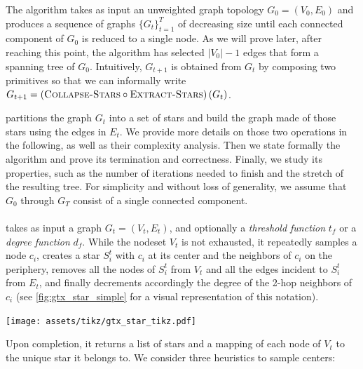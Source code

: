 The \gtx{} algorithm takes as input an unweighted graph topology $G_0=(V_0, E_0)$ and produces a sequence of
graphs $\{G_t\}_{t=1}^T$ of decreasing size until each connected component of $G_0$ is reduced to a
single node. As we will prove later, after reaching this point, the algorithm has selected $|V_0| -
1$ edges that form a spanning tree of $G_0$. Intuitively, $G_{t+1}$ is obtained from $G_t$ by composing two
primitives so that we can informally write $G_{t+1} = \left(\textsc{Collapse-Stars}{} \circ
\textsc{Extract-Stars}{}\right)(G_t)$.

\extractStar{} partitions the graph $G_t$ into a set of stars and \collapseStar{} build the graph
made of those stars using the edges in $E_t$. We provide more details on those two operations in the
following, as well as their complexity analysis. Then we state formally the \gtx{} algorithm and prove
its termination and correctness.  Finally, we study its properties, such as the number of iterations
needed to finish and the stretch of the resulting tree. For simplicity and without loss of
generality, we assume that $G_0$ through $G_T$ consist of a single connected component.

\medskip

\paragraph{\extractStar{}}\label{par:extractstar}%
\extractStar{} takes as input a graph $G_t=(V_t, E_t)$, and optionally a \emph{threshold function}
$t_f$ or a \emph{degree function} $d_f$. While the nodeset $V_t$ is not exhausted, it repeatedly samples a
node $c_i$, creates a star $S_i^t$ with $c_i$ at its center and the neighbors of $c_i$ on the
periphery, removes all the nodes of $S_i^t$ from
$V_t$ and all the edges incident to $S_i^t$ from $E_t$, and finally decrements accordingly the
degree of the 2-hop neighbors of $c_i$ (see \autoref{fig:gtx_star_simple} for a visual
representation of this notation).
\begin{marginfigure}
  \centering
  \texttt{[image: assets/tikz/gtx\_star\_tikz.pdf]}
  \caption[A sample star]{A sample star created during the \tth{} collapse level. The black node
    is the center $c_i$ of the star $S_i^t$, which is also made of the four light gray peripheral nodes
  as well as the solid edges. The 2-hops neighbors of $c_i$ are the white nodes
  $h_1$ to $h_3$, whose degree will decrease once $S_i^t$ is removed from $G_t$.}
  \label{fig:gtx_star_simple}
\end{marginfigure}%
Upon completion, it returns a list of stars and a mapping of
each node of $V_t$ to the unique star it belongs to. We consider three heuristics to sample centers:

